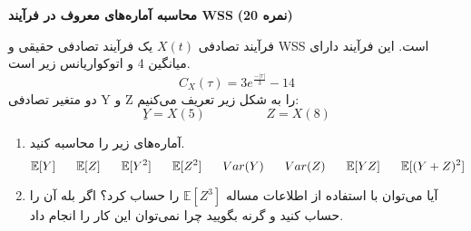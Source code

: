 \Large \textbf{محاسبه آماره‌های معروف در فرآیند WSS}
\large \textbf{(20 نمره)}

\normalsize \vspace{0.5cm}
فرآیند تصادفی
$ X(t) $
یک فرآیند تصادفی حقیقی و WSS است. این فرآیند دارای میانگین 4 و اتوکواریانس زیر است.
$$
C_X(\tau) = 3 e^{\frac{-|\tau|}{3}} - 14
$$
دو متغیر تصادفی Y و Z را به شکل زیر تعریف می‌کنیم:
$$
ِY = X(5)  \hspace{2cm} Z = X(8)
$$
\begin{enumerate}[label=(\alph*)]
	\item
آماره‌های زیر را محاسبه کنید.
$$
\mathbb{E}[Y] 
\hspace{0.6cm} 
\mathbb{E}[Z] 
\hspace{0.6cm}
\mathbb{E}[Y^2] 
\hspace{0.6cm} 
\mathbb{E}[Z^2] 
\hspace{0.6cm}
Var(Y)
\hspace{0.6cm} 
Var(Z)
\hspace{0.6cm}
\mathbb{E}[YZ] 
\hspace{0.6cm} 
\mathbb{E}[(Y+Z)^2] 
\hspace{0.6cm}
$$
	\item 
آیا می‌توان با استفاده از اطلاعات مساله
$ \mathbb{E}[Z^3] $
را حساب کرد؟ اگر بله آن را حساب کنید و گرنه بگویید چرا نمی‌توان این کار را انجام داد.
\end{enumerate}


